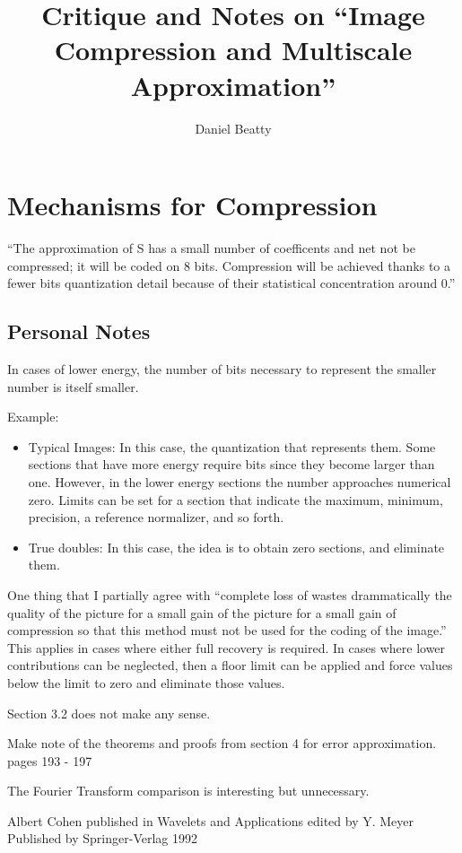 \documentclass[11pt]{article}
\title{Critique and Notes on ``Image Compression and Multiscale Approximation''}
\author{Daniel Beatty}
\begin{document}
\maketitle

\section {Mechanisms for Compression}
``The approximation of S has a small number of coefficents and net not be compressed; it will be coded on 8 bits.  Compression will be achieved thanks to a fewer bits quantization detail because of their statistical concentration around 0.''

\subsection {Personal Notes}
In cases of lower energy, the number of bits necessary to represent the smaller number is itself smaller.  

Example: 
\begin{itemize}
\item Typical Images: In this case, the quantization that represents them.  Some sections that have more energy require bits since they become larger than one.  However, in the lower energy sections the number approaches numerical zero.  Limits can be set for a section that indicate the maximum, minimum, precision, a reference normalizer, and so forth.
\item True doubles:  In this case, the idea is to obtain zero sections, and eliminate them.
\end{itemize}

One thing that I partially agree with ``complete loss of wastes drammatically the quality of the picture for a small gain of the picture for a small gain of compression so that this method must not be used for the coding of the image.''  This applies in cases where either full recovery is required.  In cases where lower contributions can be neglected, then a floor limit can be applied and force values below the limit to zero and eliminate those values.

Section 3.2 does not make any sense.

Make note of the theorems and proofs from section 4 for error approximation.  pages 193 - 197

The Fourier Transform comparison is interesting but unnecessary.


\begin{thebibliography}{99}
\bibitem Albert Cohen  published in Wavelets and Applications edited by Y. Meyer Published by Springer-Verlag 1992
\end{thebibliography}

 
\end{document}
